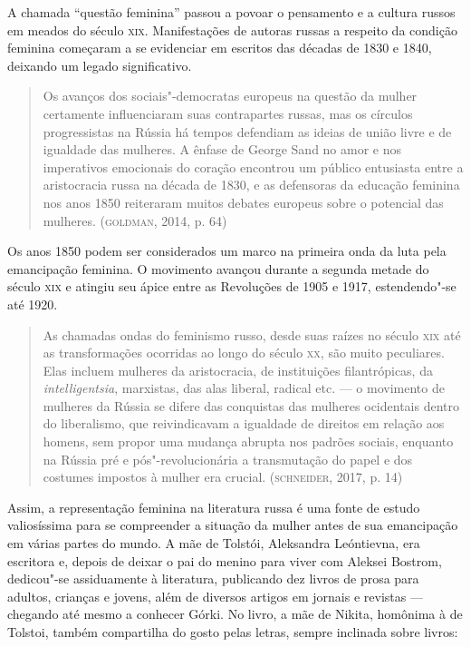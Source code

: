 \documentclass[11pt]{extarticle}
\begin{document}
A chamada ``questão feminina'' passou a povoar o pensamento e a cultura
russos em meados do século \textsc{xix}. Manifestações de autoras russas a
respeito da condição feminina começaram a se evidenciar em escritos das
décadas de 1830 e 1840, deixando um legado significativo.

\begin{quote}
Os avanços dos sociais"-democratas europeus na questão da mulher
certamente influenciaram suas contrapartes russas, mas os círculos
progressistas na Rússia há tempos defendiam as ideias de união livre e
de igualdade das mulheres. A ênfase de George Sand no amor e nos
imperativos emocionais do coração encontrou um público entusiasta entre
a aristocracia russa na década de 1830, e as defensoras da educação
feminina nos anos 1850 reiteraram muitos debates europeus sobre o
potencial das mulheres. (\textsc{goldman}, 2014, p. 64)
\end{quote}

Os anos 1850 podem ser considerados um marco na primeira onda da luta
pela emancipação feminina. O movimento avançou durante a segunda metade
do século \textsc{xix} e atingiu seu ápice entre as Revoluções de 1905 e 1917,
estendendo"-se até 1920.

\begin{quote}
As chamadas ondas do feminismo russo, desde suas raízes no século \textsc{xix}
até as transformações ocorridas ao longo do século \textsc{xx}, são muito
peculiares. Elas incluem mulheres da aristocracia, de instituições
filantrópicas, da \emph{intelligentsia}, marxistas, das alas liberal,
radical etc. --- o movimento de mulheres da Rússia se difere das
conquistas das mulheres ocidentais dentro do liberalismo, que
reivindicavam a igualdade de direitos em relação aos homens, sem propor
uma mudança abrupta nos padrões sociais, enquanto na Rússia pré e
pós"-revolucionária a transmutação do papel e dos costumes impostos à
mulher era crucial. (\textsc{schneider}, 2017, p. 14)
\end{quote}

Assim, a representação feminina na literatura russa é uma fonte de
estudo valiosíssima para se compreender a situação da mulher antes de
sua emancipação em várias partes do mundo. A mãe de Tolstói, Aleksandra
Leóntievna, era escritora e, depois de deixar o pai do menino para viver
com Aleksei Bostrom, dedicou"-se assiduamente à literatura, publicando
dez livros de prosa para adultos, crianças e jovens, além de diversos
artigos em jornais e revistas --- chegando até mesmo a conhecer Górki.
No livro, a mãe de Nikita, homônima à de Tolstoi, também compartilha do
gosto pelas letras, sempre inclinada sobre livros:
\end{document}
